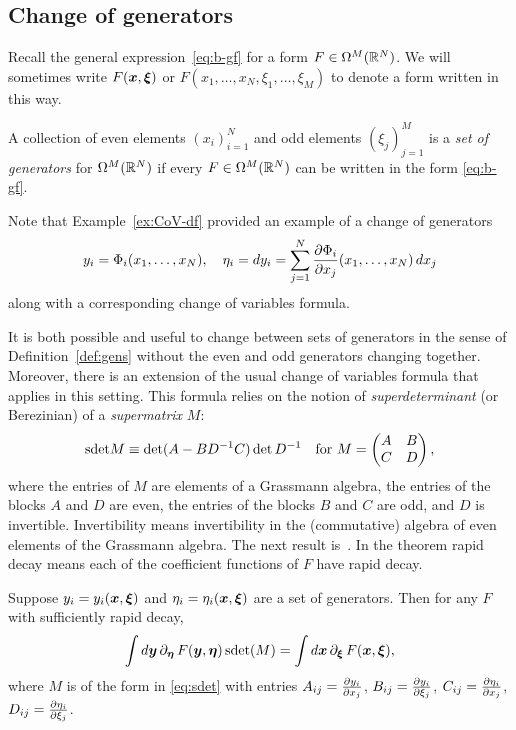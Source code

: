 \documentclass[11pt,a4paper]{article}
\begin{document}
\subsection{Change of generators}
\label{sec:cov}

Recall the general expression~\eqref{eq:b-gf} for a form
$F\in\Omega^{M}(\mathbb{R}^{N})$. We will sometimes write $F(\boldsymbol{x},\boldsymbol{\xi})$ or
$F(x_{1},\dots, x_{N},\xi_{1},\dots, \xi_{M})$ to denote a form
written in this way. 

\begin{definition}
  \label{def:gens}
  A collection of even elements $(x_i)_{i=1}^N$ and odd elements $(\xi_j)_{j=1}^M$
  is a \emph{set of generators} for $\Omega^M(\mathbb{R}^N)$ if every $F \in
  \Omega^M(\mathbb{R}^N)$ can be written in the form \eqref{eq:b-gf}.
\end{definition}

Note that Example~\ref{ex:CoV-df} provided an example of a
change of generators
\begin{equation}
  \label{eq:CoV-df-revisit}
  y_{i} = \Phi_{i}(x_{1},\dots, x_{N}), \quad 
  \eta_i = dy_i = \sum_{j=1}^{N} \frac{\partial \Phi_i}{\partial x_j}(x_{1}, \dots, x_{N}) \, dx_j
\end{equation}
along with a corresponding change of variables formula.


It is both possible and useful to
change between sets of generators in the sense of
Definition~\ref{def:gens} without the even and odd generators changing
together. Moreover, there is an extension of the usual change of
variables formula that applies in this setting.
This formula relies on the notion of \emph{superdeterminant} (or Berezinian)
  of a \emph{supermatrix} $M$:
\begin{equation}
  \label{eq:sdet}
  \mathrm{sdet} M \equiv \det (A-BD^{-1}C)\det D^{-1} \quad \text{for }
  M = \begin{pmatrix} A & B \\ C & D \end{pmatrix},
\end{equation}
where the entries of $M$ are elements of a Grassmann algebra, the
entries of the blocks $A$ and $D$ are even, the entries of the blocks
$B$ and $C$ are odd, and $D$ is invertible. Invertibility means
invertibility in the (commutative) algebra of even elements of the
Grassmann algebra.  The next result
is~\cite[Theorem~2.1]{MR914369}. In the theorem rapid decay
  means each of the coefficient functions of $F$ have rapid decay.
\begin{theorem}
  \label{thm:susy-cov}
  Suppose $y_{i}=y_{i}(\boldsymbol{x},\boldsymbol{\xi})$ and $\eta_{i} =
  \eta_{i}(\boldsymbol{x},\boldsymbol{\xi})$ are a set of generators. Then for any $F$
  with sufficiently rapid decay,
  \begin{equation}
    \label{eq:susy-cov}
    \int d\boldsymbol{y} \, \partial_{\boldsymbol{\eta}}\, F(\boldsymbol{y},\boldsymbol{\eta}) \,
    \mathrm{sdet}(M) = \int d\boldsymbol{x}\, \partial_{\boldsymbol{\xi}}\, F(\boldsymbol{x},\boldsymbol{\xi}),
  \end{equation}
  where $M$ is of the form in \eqref{eq:sdet} with entries
  $A_{ij} = \frac{\partial y_{i}}{\partial x_{j}}$, $B_{ij} = \frac{\partial y_{i}}{\partial \xi_{j}}$,
  $C_{ij} = \frac{\partial \eta_{i}}{\partial x_{j}}$,
  $D_{ij} = \frac{\partial \eta_{i}}{\partial \xi_{j}}$.
\end{theorem}
\end{document}
